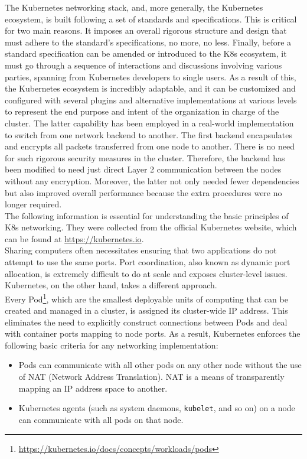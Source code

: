 The Kubernetes networking stack, and, more generally, the Kubernetes ecosystem,
is built following a set of standards and specifications. This is critical for two
main reasons. It imposes an overall rigorous structure and design that must
adhere to the standard's specifications, no more, no less. Finally, before a
standard specification can be amended or introduced to the K8s ecosystem, it must
go through a sequence of interactions and discussions involving various parties,
spanning from Kubernetes developers to single users. As a result of this, the
Kubernetes ecosystem is incredibly adaptable, and it can be customized and configured
with several plugins and alternative implementations at various levels to represent
the end purpose and intent of the organization in charge of the cluster. The
latter capability has been employed in a real-world implementation to switch
from one network backend to another. The first backend encapsulates and encrypts
all packets transferred from one node to another. There is no need for such
rigorous security measures in the cluster. Therefore, the backend has been
modified to need just direct Layer 2 communication between the nodes without any
encryption. Moreover, the latter not only needed fewer dependencies but also
improved overall performance because the extra procedures were no longer
required. \\ %
The following information is essential for understanding the basic principles of
K8s networking. They were collected from the official Kubernetes website, which
can be found at \url{https://kubernetes.io}. \\ %
Sharing computers often necessitates ensuring that two applications do not
attempt to use the same ports. Port coordination, also known as dynamic port
allocation, is extremely difficult to do at scale and exposes cluster-level issues.
Kubernetes, on the other hand, takes a different approach. \\ %
Every Pod\footnote{\url{https://kubernetes.io/docs/concepts/workloads/pods}}, which
are the smallest deployable units of computing that can be created and managed in
a cluster, is assigned its cluster-wide IP address. This eliminates the need to explicitly
construct connections between Pods and deal with container ports mapping to node
ports. As a result, Kubernetes enforces the following basic criteria for any networking
implementation:
\begin{itemize}
  \item Pods can communicate with all other pods on any other node without the use
    of NAT (Network Address Translation). NAT is a means of transparently
    mapping an IP address space to another\cite{nat}.

  \item Kubernetes agents (such as system daemons, \texttt{kubelet}, and so on)
    on a node can communicate with all pods on that node.
\end{itemize}
